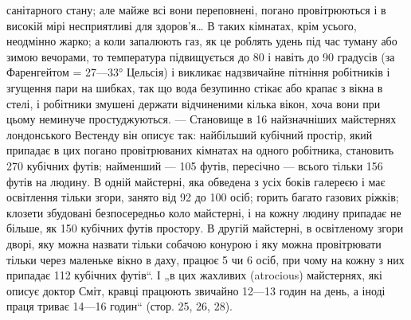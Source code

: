 \parcont{}  %
санітарного стану; але майже всі вони переповнені, погано провітрюються і в високій мірі
несприятливі для здоров’я\dots{} В таких
кімнатах, крім усього, неодмінно жарко; а коли запалюють газ,
як це роблять удень під час туману або зимою вечорами, то температура підвищується до 80 і навіть до
90 градусів (за Фаренгейтом = 27—33° Цельсія) і викликає надзвичайне пітніння робітників
і згущення пари на шибках, так що вода безупинно стікає або
крапає з вікна в стелі, і робітники змушені держати відчиненими
кілька вікон, хоча вони при цьому неминуче простуджуються. —
Становище в 16 найзначніших майстернях лондонського Вестенду
він описує так: найбільший кубічний простір, який припадає
в цих погано провітрюваних кімнатах на одного робітника, становить 270 кубічних футів; найменший —
105 футів, пересічно —
всього тільки 156 футів на людину. В одній майстерні, яка обведена з усіх боків галереєю і має
освітлення тільки згори,
занято від 92 до 100 осіб; горить багато газових ріжків; клозети
збудовані безпосередньо коло майстерні, і на кожну людину
припадає не більше, як 150 кубічних футів простору. В другій
майстерні, в освітленому згори дворі, яку можна назвати тільки
собачою конурою і яку можна провітрювати тільки через маленьке вікно в даху, працює 5 чи 6 осіб, при
чому на кожну
з них припадає 112 кубічних футів“. І „в цих жахливих (atrocious) майстернях, які описує доктор
Сміт, кравці працюють
звичайно 12—13 годин на день, а іноді праця триває 14—16 годин“ (стор. 25, 26, 28).

